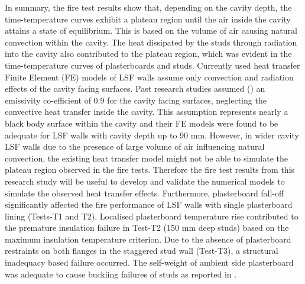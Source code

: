 In summary, the fire test results show that, depending on the cavity depth, the time-temperature curves exhibit a plateau region until the air inside the cavity attains a state of equilibrium. This is based on the volume of air causing natural convection within the cavity. The heat dissipated by the studs through radiation into the cavity also contributed to the plateau region, which was evident in the time-temperature curves of plasterboards and studs. Currently used heat transfer Finite Element (FE) models of LSF walls assume only convection and radiation effects of the cavity facing surfaces. Past research studies assumed (\citet{Feng2003,Keerthan2012a,Gunalan2013f,Rusthi2017}) an emissivity co-efficient of 0.9 for the cavity facing surfaces, neglecting the convective heat transfer inside the cavity. This assumption represents nearly a black body surface within the cavity and their FE models were found to be adequate for LSF walls with cavity depth up to 90 mm. However, in wider cavity LSF walls due to the presence of large volume of air influencing natural convection, the existing heat transfer model might not be able to simulate the plateau region observed in the fire tests. Therefore the fire test results from this research study will be useful to develop and validate the numerical models to simulate the observed heat transfer effects. Furthermore, plasterboard fall-off significantly affected the fire performance of LSF walls with single plasterboard lining (Tests-T1 and T2). Localised plasterboard temperature rise contributed to the premature insulation failure in Test-T2 (150 mm deep studs) based on the maximum insulation temperature criterion. Due to the absence of plasterboard restraints on both flanges in the staggered stud wall (Test-T3), a structural inadequacy based failure occurred. The self-weight of ambient side plasterboard was adequate to cause buckling failures of studs as reported in \citet{Dias2018}.




